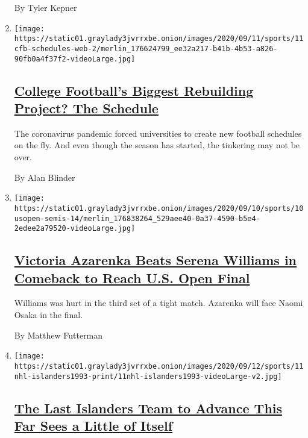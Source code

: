 \begin{enumerate}
  By Tyler Kepner
\item
  \texttt{[image: https://static01.graylady3jvrrxbe.onion/images/2020/09/11/sports/11cfb-schedules-web-2/merlin\_176624799\_ee32a217-b41b-4b53-a826-90fb0a4f37f2-videoLarge.jpg]}

  \hypertarget{college-footballs-biggest-rebuilding-project-the-schedule}{%
  \subsection{\texorpdfstring{\href{/2020/09/11/sports/ncaafootball/college-football-schedule.html}{College
  Football's Biggest Rebuilding Project? The
  Schedule}}{College Football's Biggest Rebuilding Project? The Schedule}}\label{college-footballs-biggest-rebuilding-project-the-schedule}}

  The coronavirus pandemic forced universities to create new football
  schedules on the fly. And even though the season has started, the
  tinkering may not be over.

  By Alan Blinder
\item
  \texttt{[image: https://static01.graylady3jvrrxbe.onion/images/2020/09/10/sports/10usopen-semis-14/merlin\_176838264\_529aee40-0a37-4590-b5e4-2edee2a79520-videoLarge.jpg]}

  \hypertarget{victoria-azarenka-beats-serena-williams-in-comeback-to-reach-us-open-final}{%
  \subsection{\texorpdfstring{\href{/2020/09/10/sports/tennis/us-open-naomi-osaka-jennifer-brady-serena-williams-victoria-azarenka-semifinal.html}{Victoria
  Azarenka Beats Serena Williams in Comeback to Reach U.S. Open
  Final}}{Victoria Azarenka Beats Serena Williams in Comeback to Reach U.S. Open Final}}\label{victoria-azarenka-beats-serena-williams-in-comeback-to-reach-us-open-final}}

  Williams was hurt in the third set of a tight match. Azarenka will
  face Naomi Osaka in the final.

  By Matthew Futterman
\item
  \texttt{[image: https://static01.graylady3jvrrxbe.onion/images/2020/09/12/sports/11nhl-islanders1993-print/11nhl-islanders1993-videoLarge-v2.jpg]}

  \hypertarget{the-last-islanders-team-to-advance-this-far-sees-a-little-of-itself}{%
  \subsection{\texorpdfstring{\href{/2020/09/11/sports/hockey/islanders-NHL-playoffs-1993.html}{The
  Last Islanders Team to Advance This Far Sees a Little of
  Itself}}{The Last Islanders Team to Advance This Far Sees a Little of Itself}}\label{the-last-islanders-team-to-advance-this-far-sees-a-little-of-itself}}


\end{enumerate}
